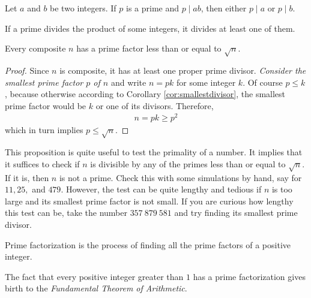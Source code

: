 \documentclass{subfile}
\begin{document}
	\begin{proposition}\label{prop:euclidslemma}
		Let $a$ and $b$ be two integers. If $p$ is a prime and $p\mid ab$, then either $p\mid a$ or $p\mid b$.
	\end{proposition}

	\begin{corollary}\label{cor:euclidgeneral}
		If a prime divides the product of some integers, it divides at least one of them.
	\end{corollary}

	\begin{proposition}\label{factorsqrt}
		Every composite $n$ has a prime factor less than or equal to $\sqrt{n}$.
	\end{proposition}

	\begin{proof}
		Since $n$ is composite, it has at least one proper prime divisor. {\it Consider the smallest prime factor $p$ of $n$} and write $n=pk$ for some integer $k$. Of course $p\leq k$, because otherwise according to Corollary \eqref{cor:smallestdivisor}, the smallest prime factor would be $k$ or one of its divisors. Therefore,
		\begin{align*}
			n=pk\geq p^2
		\end{align*}
		which in turn implies $p\leq \sqrt{n}$.
	\end{proof}

	This proposition is quite useful to test the primality of a number. It implies that it suffices to check if $n$ is divisible by any of the primes less than or equal to $\sqrt{n}$. If it is, then $n$ is not a prime. Check this with some simulations by hand, say for $11,25,$ and $479$. However, the test can be quite lengthy and tedious if $n$ is too large and its smallest prime factor is not small. If you are curious how lengthy this test can be, take the number $357 \ 879 \ 581$ and try finding its smallest prime divisor.

	\begin{definition}
		Prime factorization is the process of finding all the prime factors of a positive integer.
	\end{definition}

	The fact that every positive integer greater than $1$ has a prime factorization gives birth to the \textit{Fundamental Theorem of Arithmetic}.
\end{document}
